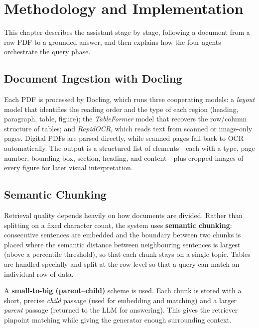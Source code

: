 \documentclass[12pt,a4paper]{report}
\begin{document}
\chapter{Methodology and Implementation}

This chapter describes the assistant stage by stage, following a document from a
raw PDF to a grounded answer, and then explains how the four agents orchestrate the
query phase.

\section{Document Ingestion with Docling}
Each PDF is processed by Docling, which runs three cooperating models: a
\emph{layout} model that identifies the reading order and the type of each region
(heading, paragraph, table, figure); the \emph{TableFormer} model that recovers
the row/column structure of tables; and \emph{RapidOCR}, which reads text from
scanned or image-only pages. Digital PDFs are parsed directly, while scanned pages
fall back to OCR automatically. The output is a structured list of elements---each
with a type, page number, bounding box, section, heading, and content---plus
cropped images of every figure for later visual interpretation.

\section{Semantic Chunking}
Retrieval quality depends heavily on how documents are divided. Rather than
splitting on a fixed character count, the system uses \textbf{semantic chunking}:
consecutive sentences are embedded and the boundary between two chunks is placed
where the semantic distance between neighbouring sentences is largest (above a
percentile threshold), so that each chunk stays on a single topic. Tables are
handled specially and split at the row level so that a query can match an
individual row of data.

A \textbf{small-to-big (parent--child)} scheme is used. Each chunk is stored with
a short, precise \emph{child} passage (used for embedding and matching) and a
larger \emph{parent} passage (returned to the LLM for answering). This gives the
retriever pinpoint matching while giving the generator enough surrounding context.
\end{document}
